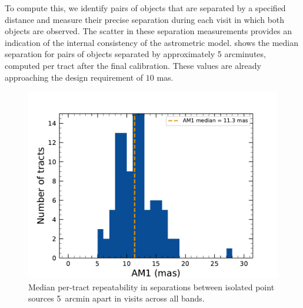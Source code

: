 To compute this, we identify pairs of objects that are separated by a specified distance and measure their precise separation during each visit in which both objects are observed.
The scatter in these separation measurements provides an indication of the internal consistency of the astrometric model.
 shows the median separation for pairs of objects separated by approximately 5 arcminutes, computed per tract after the final calibration.
These values are already approaching the design requirement of $10$ mas.
\begin{figure}[htb]
\includegraphics[width=\linewidth]{Astrometry_AM1}
 \caption{Median per-tract repeatability in separations between isolated point sources 5~arcmin apart in visits across all bands.}
 \label{fig:AM1}
 \end{figure}

